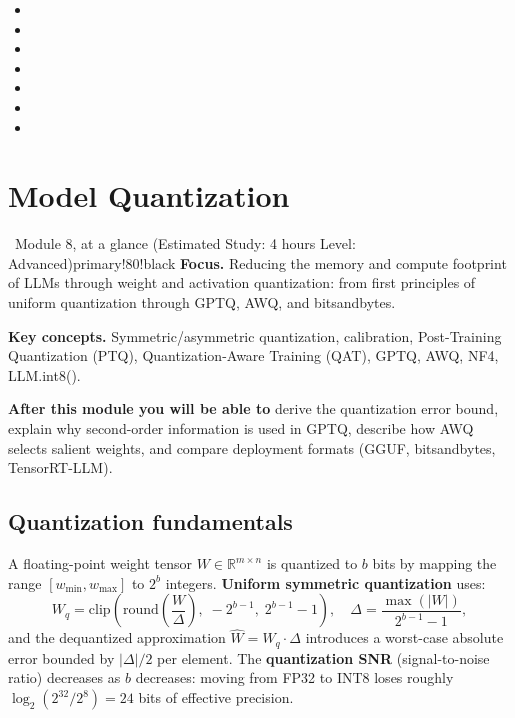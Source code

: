 \documentclass[11pt,a4paper]{article}
\begin{document}
	\begin{sourcesbox}
		\small
		\begin{itemize}[nosep]
			\item {}
			\item {}
			\item {}
			\item {}
			\item {}
			\item {}
			\item {}
		\end{itemize}
	\end{sourcesbox}

	\clearpage
	\section{Model Quantization}
	\label{sec:quantization}

	\begin{modulecard}{\faCompress\ Module 8, at a glance \hfill \small\normalfont (Estimated Study: 4 hours \textbullet{} Level: Advanced)}{primary!80!black}
		\textbf{Focus.} Reducing the memory and compute footprint of LLMs through weight and activation quantization: from first principles of uniform quantization through GPTQ, AWQ, and bitsandbytes.

		\medskip
		\textbf{Key concepts.} Symmetric/asymmetric quantization, calibration, Post-Training Quantization (PTQ), Quantization-Aware Training (QAT), GPTQ, AWQ, NF4, LLM.int8().

		\medskip
		\textbf{After this module you will be able to} derive the quantization error bound, explain why second-order information is used in GPTQ, describe how AWQ selects salient weights, and compare deployment formats (GGUF, bitsandbytes, TensorRT-LLM).
	\end{modulecard}

	\subsection{Quantization fundamentals}

	A floating-point weight tensor $W \in \mathbb{R}^{m \times n}$ is quantized to $b$ bits by mapping the range $[w_{\min}, w_{\max}]$ to $2^b$ integers. \textbf{Uniform symmetric quantization} uses:
	\begin{equation}
		W_q = \mathrm{clip}\!\left(\mathrm{round}\!\left(\frac{W}{\Delta}\right),\; -2^{b-1},\; 2^{b-1}-1\right),
		\quad \Delta = \frac{\max(|W|)}{2^{b-1}-1},
	\end{equation}
	and the dequantized approximation $\hat{W} = W_q \cdot \Delta$ introduces a worst-case absolute error bounded by $|\Delta|/2$ per element. The \textbf{quantization SNR} (signal-to-noise ratio) decreases as $b$ decreases: moving from FP32 to INT8 loses roughly $\log_2(2^{32}/2^8) = 24$ bits of effective precision.
\end{document}

